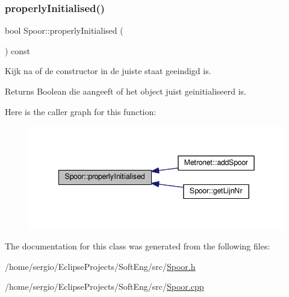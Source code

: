 \subsubsection{\texorpdfstring{properly\+Initialised()}{properlyInitialised()}}
{\footnotesize\ttfamily bool Spoor\+::properly\+Initialised (\begin{DoxyParamCaption}{ }\end{DoxyParamCaption}) const}



Kijk na of de constructor in de juiste staat geeindigd is. 

\begin{DoxyReturn}{Returns}
Boolean die aangeeft of het object juist geinitialiseerd is. 
\end{DoxyReturn}
Here is the caller graph for this function\+:\nopagebreak
\begin{figure}[H]
\begin{center}
\leavevmode
\includegraphics[width=342pt]{class_spoor_a1eb7c54228676cdb7c8620104e063a3c_icgraph}
\end{center}
\end{figure}


The documentation for this class was generated from the following files\+:\begin{DoxyCompactItemize}
\item 
/home/sergio/\+Eclipse\+Projects/\+Soft\+Eng/src/\hyperlink{_spoor_8h}{Spoor.\+h}\item 
/home/sergio/\+Eclipse\+Projects/\+Soft\+Eng/src/\hyperlink{_spoor_8cpp}{Spoor.\+cpp}\end{DoxyCompactItemize}
